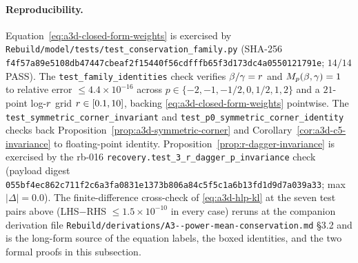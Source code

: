 \paragraph{Reproducibility.}
Equation~\eqref{eq:a3d-closed-form-weights} is exercised by
\texttt{Rebuild/model/tests/test\_conservation\_family.py}
(SHA-256
\texttt{f4f57a89e5108db47447cbeaf2f15440f56cdfffb65f3d173dc4a0550121791e};
$14/14$ PASS). The
\texttt{test\_family\_identities} check verifies $\beta/\gamma
= r$ and $M_p(\beta, \gamma) = 1$ to relative error
$\le 4.4 \times 10^{-16}$ across
$p \in \{-2, -1, -1/2, 0, 1/2, 1, 2\}$ and a $21$-point
log-$r$ grid $r \in [0.1, 10]$, backing
\eqref{eq:a3d-closed-form-weights} pointwise.
The
\texttt{test\_symmetric\_corner\_invariant} and
\texttt{test\_p0\_symmetric\_corner\_identity} checks back
Proposition~\ref{prop:a3d-symmetric-corner} and
Corollary~\ref{cor:a3d-c5-invariance} to floating-point identity.
Proposition~\ref{prop:r-dagger-invariance} is exercised by the
rb-016 \texttt{recovery.test\_3\_r\_dagger\_p\_invariance} check
(payload digest
\texttt{055bf4ec862c711f2c6a3fa0831e1373b806a84c5f5c1a6b13fd1d9d7a039a33};
max $|\Delta| = 0.0$). The finite-difference cross-check of
\eqref{eq:a3d-hlp-kl} at the seven test pairs above (LHS$-$RHS
$\le 1.5 \times 10^{-10}$ in every case) reruns at the companion
derivation file
\texttt{Rebuild/derivations/A3{-}{-}power-mean-conservation.md} §3.2
and is the long-form source of the equation labels, the boxed
identities, and the two formal proofs in this subsection.
